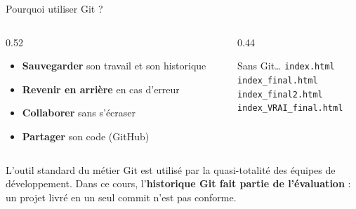\documentclass[aspectratio=169,11pt]{beamer}
\begin{document}
\begin{frame}{Pourquoi utiliser Git ?}
  \begin{columns}[T]
    \begin{column}{0.52\textwidth}
      \begin{itemize}
        \item \textbf{Sauvegarder} son travail et son historique
        \item \textbf{Revenir en arrière} en cas d'erreur
        \item \textbf{Collaborer} sans s'écraser
        \item \textbf{Partager} son code (GitHub)
      \end{itemize}
    \end{column}
    \begin{column}{0.44\textwidth}
      \begin{alertblock}{Sans Git\ldots}
        \small
        \texttt{index.html}\\
        \texttt{index\_final.html}\\
        \texttt{index\_final2.html}\\
        \texttt{index\_VRAI\_final.html}
      \end{alertblock}
    \end{column}
  \end{columns}
  \vspace{0.35cm}
  \begin{block}{L'outil standard du métier}
    Git est utilisé par la quasi-totalité des équipes de développement. Dans ce cours, l'\textbf{historique Git fait partie de l'évaluation} : un projet livré en un seul commit n'est pas conforme.
  \end{block}
\end{frame}
\end{document}
